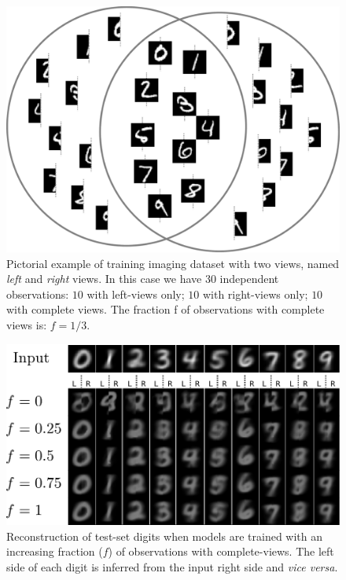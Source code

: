 \begin{figure}[!h]
\centering
\includegraphics[width=0.8\columnwidth]{./tex/fig/mnist_scheme.pdf}
\caption{
	Pictorial example of training imaging dataset with two views, named \textit{left} and \textit{right} views.
	In this case we have 30 independent observations:
	$10$ with left-views only; $10$ with right-views only; $10$ with complete views.
	The fraction f of observations with complete views is:
	$f = 1/3$.
}
\label{fig:mnist_scheme}
\end{figure}
%
\begin{figure}[!h]
\centering
\includegraphics[width=0.8\columnwidth]{./tex/fig/mnist_half.pdf}
\caption{
	Reconstruction of test-set digits when models are trained with an increasing fraction ($f$) of observations with complete-views.
	The left side of each digit is inferred from the input right side and \textit{vice versa}.
}
\label{fig:mnist_half}
\end{figure}
